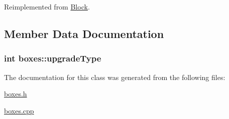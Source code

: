 Reimplemented from \hyperlink{class_block_a915a8196ec94388fb2aae7788af88705}{Block}.



\subsection{Member Data Documentation}
\hypertarget{classboxes_ad34ca64e7ce23ca05cff8c2b1f8deb36}{
\subsubsection[{upgrade\-Type}]{\setlength{\rightskip}{0pt plus 5cm}int boxes\-::upgrade\-Type\hspace{0.3cm}{\ttfamily [protected]}}}\label{classboxes_ad34ca64e7ce23ca05cff8c2b1f8deb36}


The documentation for this class was generated from the following files\-:\begin{DoxyCompactItemize}
\item 
\hyperlink{boxes_8h}{boxes.\-h}\item 
\hyperlink{boxes_8cpp}{boxes.\-cpp}\end{DoxyCompactItemize}
